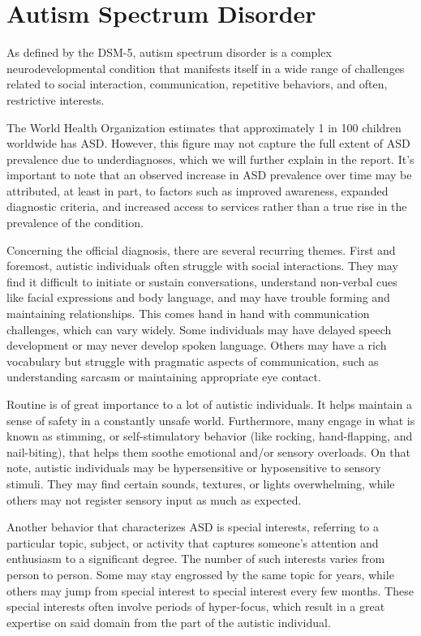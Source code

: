 \section{Autism Spectrum Disorder}

As defined by the DSM-5, autism spectrum disorder is a complex neurodevelopmental condition that manifests itself in a wide range of challenges related to social interaction, communication, repetitive behaviors, and often, restrictive interests.

The World Health Organization estimates that approximately 1 in 100 children worldwide has ASD. However, this figure may not capture the full extent of ASD prevalence due to underdiagnoses, which we will further explain in the report. It's important to note that an observed increase in ASD prevalence over time may be attributed, at least in part, to factors such as improved awareness, expanded diagnostic criteria, and increased access to services rather than a true rise in the prevalence of the condition.

Concerning the official diagnosis, there are several recurring themes. First and foremost, autistic individuals often struggle with social interactions. They may find it difficult to initiate or sustain conversations, understand non-verbal cues like facial expressions and body language, and may have trouble forming and maintaining relationships. This comes hand in hand with communication challenges, which can vary widely. Some individuals may have delayed speech development or may never develop spoken language. Others may have a rich vocabulary but struggle with pragmatic aspects of communication, such as understanding sarcasm or maintaining appropriate eye contact.

Routine is of great importance to a lot of autistic individuals. It helps maintain a sense of safety in a constantly unsafe world. Furthermore, many engage in what is known as stimming, or self-stimulatory behavior (like rocking, hand-flapping, and nail-biting), that helps them soothe emotional and/or sensory overloads. On that note, autistic individuals may be hypersensitive or hyposensitive to sensory stimuli. They may find certain sounds, textures, or lights overwhelming, while others may not register sensory input as much as expected.

Another behavior that characterizes ASD is special interests, referring to a particular topic, subject, or activity that captures someone's attention and enthusiasm to a significant degree. The number of such interests varies from person to person. Some may stay engrossed by the same topic for years, while others may jump from special interest to special interest every few months. These special interests often involve periods of hyper-focus, which result in a great expertise on said domain from the part of the autistic individual.

